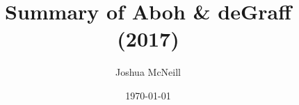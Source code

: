 \documentclass{article}
\title{Summary of Aboh \& deGraff (2017)}
\author{Joshua McNeill}
\date{\today}
\begin{document}
  \maketitle
  \onehalfspacing
    \citeauthor{roberts_null_2017}
    \printbibliography
\end{document}
